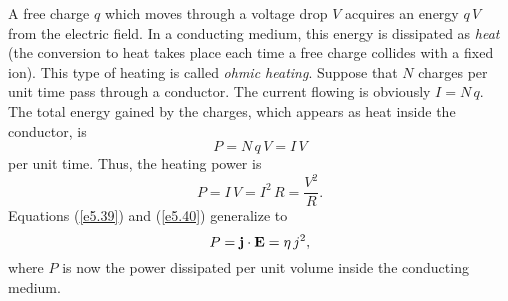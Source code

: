 A free charge $q$ which moves through a voltage drop $V$ acquires an energy $q\,V$ from the
electric field. In a conducting medium, this energy is dissipated as {\em heat}\/ (the conversion to heat takes place each time a free charge collides with a fixed ion). This type of heating
is called  {\em ohmic heating}. Suppose that $N$ charges per unit time pass through a
conductor. The current flowing is obviously $I= N\,q$. The total energy gained by the
charges, which appears as heat inside the conductor, is
\begin{equation}\label{e5.39}
P = N\,q\,V = I\,V
\end{equation}
per unit time. Thus, the heating power is
\begin{equation}\label{e5.40}
P = I\,V = I^2 \,R = \frac{V^2}{R}.
\end{equation}
Equations (\ref{e5.39}) and (\ref{e5.40}) generalize to
\begin{equation}
P = {\bf j} \cdot {\bf E} = \eta \,j^2,
\end{equation}
where $P$ is now the power dissipated per unit volume inside the conducting medium.

